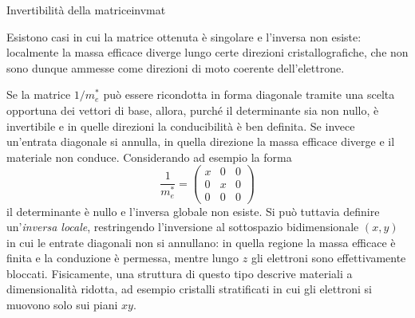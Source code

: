 \begin{solution}
\begin{note}{Invertibilità della matrice}{invmat}
\begin{attention}
    Esistono casi in cui la matrice ottenuta è singolare e l'inversa non esiste: localmente la massa efficace diverge lungo certe direzioni cristallografiche, che non sono dunque ammesse come direzioni di moto coerente dell'elettrone.
\end{attention}

Se la matrice \( 1/m_e^* \) può essere ricondotta in forma diagonale tramite una scelta opportuna dei vettori di base, allora, purché il determinante sia non nullo, è invertibile e in quelle direzioni la conducibilità è ben definita. Se invece un'entrata diagonale si annulla, in quella direzione la massa efficace diverge e il materiale non conduce. Considerando ad esempio la forma
\begin{equation}
    \frac{1}{m_e^*} =
    \begin{pmatrix}
        x & 0 & 0 \\
        0 & x & 0 \\
        0 & 0 & 0
    \end{pmatrix}
\end{equation}
il determinante è nullo e l'inversa globale non esiste. Si può tuttavia definire un'\emph{inversa locale}, restringendo l'inversione al sottospazio bidimensionale \( (x, y) \) in cui le entrate diagonali non si annullano: in quella regione la massa efficace è finita e la conduzione è permessa, mentre lungo \( z \) gli elettroni sono effettivamente bloccati. Fisicamente, una struttura di questo tipo descrive materiali a dimensionalità ridotta, ad esempio cristalli stratificati in cui gli elettroni si muovono solo sui piani \( x y \).

\end{note}


\end{solution}
